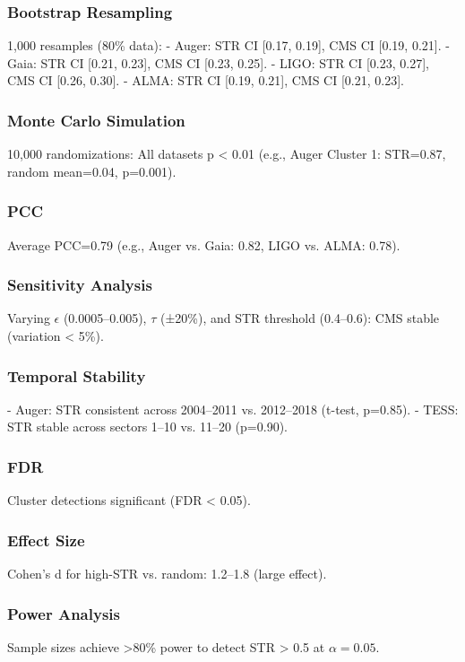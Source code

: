 \documentclass[12pt, twocolumn]{article}
\begin{document}
\subsubsection{Bootstrap Resampling}
1,000 resamples (80\% data):
- Auger: STR CI [0.17, 0.19], CMS CI [0.19, 0.21].
- Gaia: STR CI [0.21, 0.23], CMS CI [0.23, 0.25].
- LIGO: STR CI [0.23, 0.27], CMS CI [0.26, 0.30].
- ALMA: STR CI [0.19, 0.21], CMS CI [0.21, 0.23].

\subsubsection{Monte Carlo Simulation}
10,000 randomizations: All datasets p < 0.01 (e.g., Auger Cluster 1: STR=0.87, random mean=0.04, p=0.001).

\subsubsection{PCC}
Average PCC=0.79 (e.g., Auger vs. Gaia: 0.82, LIGO vs. ALMA: 0.78).

\subsubsection{Sensitivity Analysis}
Varying \(\epsilon\) (0.0005–0.005), \(\tau\) (±20\%), and STR threshold (0.4–0.6): CMS stable (variation < 5\%).

\subsubsection{Temporal Stability}
- Auger: STR consistent across 2004–2011 vs. 2012–2018 (t-test, p=0.85).
- TESS: STR stable across sectors 1–10 vs. 11–20 (p=0.90).

\subsubsection{FDR}
Cluster detections significant (FDR < 0.05).

\subsubsection{Effect Size}
Cohen’s d for high-STR vs. random: 1.2–1.8 (large effect).

\subsubsection{Power Analysis}
Sample sizes achieve >80\% power to detect STR > 0.5 at \(\alpha = 0.05\).
\end{document}
